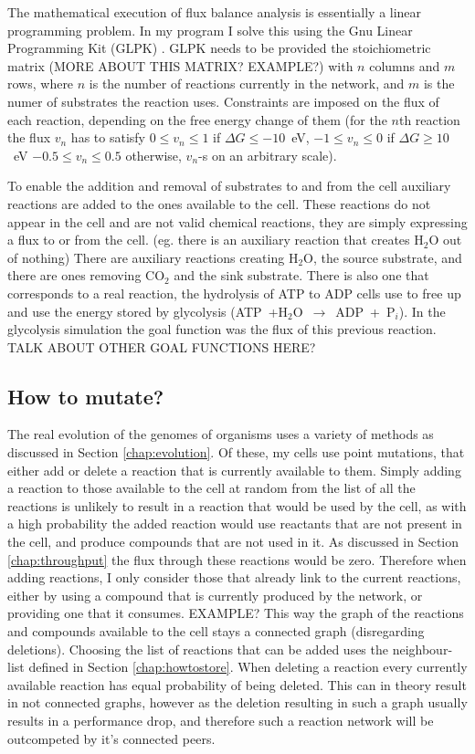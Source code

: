 \documentclass[10pt,a4paper]{article}
\begin{document}
	The mathematical execution of flux balance analysis is essentially a linear programming problem. In my program I solve this using the Gnu Linear Programming Kit (GLPK) \cite{glpk}. GLPK needs to be provided the stoichiometric matrix (MORE ABOUT THIS MATRIX? EXAMPLE?) with $n$ columns and $m$ rows, where $n$ is the number of reactions currently in the network, and $m$ is the numer of substrates the reaction uses. Constraints are imposed on the flux of each reaction, depending on the free energy change of them (for the $n$th reaction the flux $v_n$ has to satisfy $0\leq v_n \leq 1 $ if $\Delta G \leq -10$~eV, $-1\leq v_n \leq 0 $ if $\Delta G \geq 10$~eV $-0.5\leq v_n \leq 0.5$ otherwise, $v_n$-s on an arbitrary scale). 
	
	To enable the addition and removal of substrates to and from the cell auxiliary reactions are added to the ones available to the cell. These reactions do not appear in the cell and are not valid chemical reactions, they are simply expressing a flux to or from the cell. (eg. there is an auxiliary reaction that creates H$_2$O out of nothing) There are auxiliary reactions creating H$_2$O, the source substrate, and there are ones removing CO$_2$ and the sink substrate. There is also one that corresponds to a real reaction, the hydrolysis of ATP to ADP cells use to free up and use the energy stored by glycolysis (ATP~+H$_2$O~$\rightarrow$~ADP~+~P$_i$). In the glycolysis simulation the goal function was the flux of this previous reaction. 
	TALK ABOUT OTHER GOAL FUNCTIONS HERE?
		
	\subsection{How to mutate?}
	
	The real evolution of the genomes of organisms uses a variety of methods as discussed in Section \ref{chap:evolution}. Of these, my cells use point mutations, that either add or delete a reaction that is currently available to them. Simply adding a reaction to those available to the cell at random from the list of all the reactions is unlikely to result in a reaction that would be used by the cell, as with a high probability the added reaction would use reactants that are not present in the cell, and produce compounds that are not used in it. As discussed in Section \ref{chap:throughput} the flux through these reactions would be zero. Therefore when adding reactions, I only consider those that already link to the current reactions, either by using a compound that is currently produced by the network, or providing one that it consumes. EXAMPLE? This way the graph of the reactions and compounds available to the cell stays a connected graph (disregarding deletions). Choosing the list of reactions that can be added uses the neighbour-list defined in Section \ref{chap:howtostore}. When deleting a reaction every currently available reaction has equal probability of being deleted. This can in theory result in not connected graphs, however as the deletion resulting in such a graph usually results in a performance drop, and therefore such a reaction network will be outcompeted by it's connected peers. 
	
\end{document}
